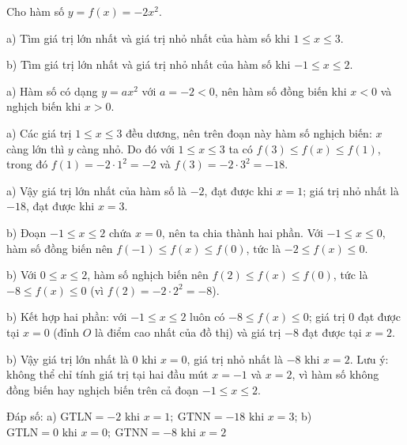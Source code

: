 \begin{problem}[9DS-HSB2-025]
Cho hàm số $y = f(x) = -2x^2$.

a) Tìm giá trị lớn nhất và giá trị nhỏ nhất của hàm số khi $1 \leq x \leq 3$.

b) Tìm giá trị lớn nhất và giá trị nhỏ nhất của hàm số khi $-1 \leq x \leq 2$.

\begin{solution}
a) Hàm số có dạng $y = ax^2$ với $a = -2 < 0$, nên hàm số đồng biến khi $x < 0$ và nghịch biến khi $x > 0$.

a) Các giá trị $1 \leq x \leq 3$ đều dương, nên trên đoạn này hàm số nghịch biến: $x$ càng lớn thì $y$ càng nhỏ. Do đó với $1 \leq x \leq 3$ ta có $f(3) \leq f(x) \leq f(1)$, trong đó $f(1) = -2 \cdot 1^2 = -2$ và $f(3) = -2 \cdot 3^2 = -18$.

a) Vậy giá trị lớn nhất của hàm số là $-2$, đạt được khi $x = 1$; giá trị nhỏ nhất là $-18$, đạt được khi $x = 3$.

b) Đoạn $-1 \leq x \leq 2$ chứa $x = 0$, nên ta chia thành hai phần. Với $-1 \leq x \leq 0$, hàm số đồng biến nên $f(-1) \leq f(x) \leq f(0)$, tức là $-2 \leq f(x) \leq 0$.

b) Với $0 \leq x \leq 2$, hàm số nghịch biến nên $f(2) \leq f(x) \leq f(0)$, tức là $-8 \leq f(x) \leq 0$ (vì $f(2) = -2 \cdot 2^2 = -8$).

b) Kết hợp hai phần: với $-1 \leq x \leq 2$ luôn có $-8 \leq f(x) \leq 0$; giá trị $0$ đạt được tại $x = 0$ (đỉnh $O$ là điểm cao nhất của đồ thị) và giá trị $-8$ đạt được tại $x = 2$.

b) Vậy giá trị lớn nhất là $0$ khi $x = 0$, giá trị nhỏ nhất là $-8$ khi $x = 2$. Lưu ý: không thể chỉ tính giá trị tại hai đầu mút $x = -1$ và $x = 2$, vì hàm số không đồng biến hay nghịch biến trên cả đoạn $-1 \leq x \leq 2$.

Đáp số: a) $\boxed{\text{GTLN} = -2 \text{ khi } x = 1;\ \text{GTNN} = -18 \text{ khi } x = 3}$; b) $\boxed{\text{GTLN} = 0 \text{ khi } x = 0;\ \text{GTNN} = -8 \text{ khi } x = 2}$
\end{solution}
\end{problem}

